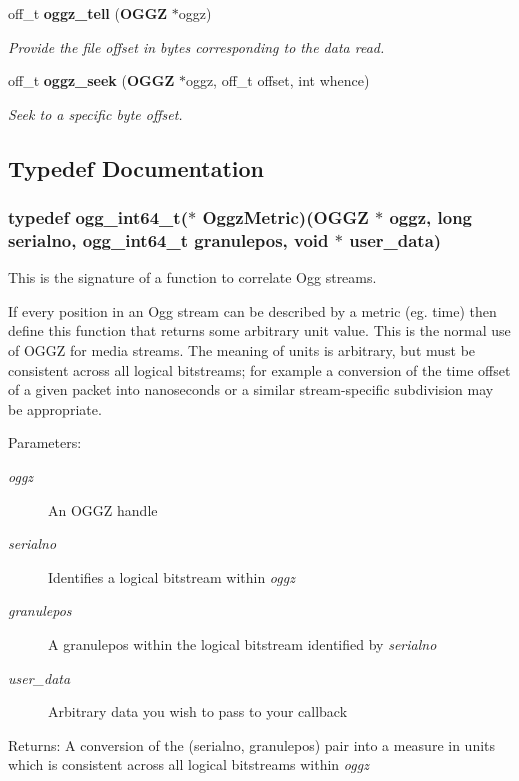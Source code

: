 \begin{CompactItemize}
off\_\-t {\bf oggz\_\-tell} ({\bf OGGZ} $\ast$oggz)
\begin{CompactList}\small\item\em Provide the file offset in bytes corresponding to the data read. \item\end{CompactList}\item 
off\_\-t {\bf oggz\_\-seek} ({\bf OGGZ} $\ast$oggz, off\_\-t offset, int whence)
\begin{CompactList}\small\item\em Seek to a specific byte offset. \item\end{CompactList}\end{CompactItemize}


\subsection{Typedef Documentation}
\subsubsection{\setlength{\rightskip}{0pt plus 5cm}typedef ogg\_\-int64\_\-t($\ast$ {\bf Oggz\-Metric})({\bf OGGZ} $\ast$ oggz, long serialno, ogg\_\-int64\_\-t granulepos, void $\ast$ user\_\-data)}\label{group__seek__api_ga0}


This is the signature of a function to correlate Ogg streams. 

If every position in an Ogg stream can be described by a metric (eg. time) then define this function that returns some arbitrary unit value. This is the normal use of OGGZ for media streams. The meaning of units is arbitrary, but must be consistent across all logical bitstreams; for example a conversion of the time offset of a given packet into nanoseconds or a similar stream-specific subdivision may be appropriate.

\begin{Desc}
\item[Parameters:]
\begin{description}
\item[{\em oggz}]An OGGZ handle \item[{\em serialno}]Identifies a logical bitstream within {\em oggz\/} \item[{\em granulepos}]A granulepos within the logical bitstream identified by {\em serialno\/} \item[{\em user\_\-data}]Arbitrary data you wish to pass to your callback \end{description}
\end{Desc}
\begin{Desc}
\item[Returns:]A conversion of the (serialno, granulepos) pair into a measure in units which is consistent across all logical bitstreams within {\em oggz\/} \end{Desc}



